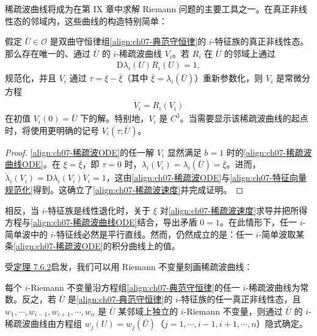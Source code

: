 \documentclass[../../main.tex]{subfiles}
\begin{document}
稀疏波曲线将成为在第 IX 章中求解 Riemann 问题的主要工具之一。在真正非线性态的邻域内，这些曲线的构造特别简单：

\begin{theorem}\label{theorem:ch07-稀疏波曲线存在唯一}
假定 $\bar{U}\in\mathscr{O}$ 是双曲守恒律组\eqref{align:ch07-典范守恒律}的 $i$-特征族的真正非线性态。那么存在唯一的、通过 $\bar{U}$ 的 $i$-稀疏波曲线 $V_i$。若 $R_i$ 在 $\bar{U}$ 的邻域上通过
\begin{align}
\mathrm{D}\lambda_i(U)R_i(U)=1,
\label{align:ch07-特征向量规范化}
\end{align}
规范化，并且 $V_i$ 通过 $\tau=\xi-\bar{\xi}$（其中 $\bar{\xi}=\lambda_i(\bar{U})$）重新参数化，则 $V_i$ 是常微分方程
\begin{align}
\dot{V}_i=R_i(V_i)
\label{align:ch07-稀疏波ODE}
\end{align}
在初值 $V_i(0)=\bar{U}$ 下的解。特别地，$V_i$ 是 $C^3$。当需要显示该稀疏波曲线的起点时，将使用更明确的记号 $V_i(\tau;\bar{U})$。
\end{theorem}

\begin{proof}
\eqref{align:ch07-稀疏波ODE}的任一解 $V_i$ 显然满足 $b=1$ 时的\eqref{align:ch07-稀疏波曲线ODE}。在 $\xi=\bar{\xi}$，即 $\tau=0$ 时，$\lambda_i(V_i)=\lambda_i(\bar{U})=\bar{\xi}$。进而，$\dot{\lambda}_i(V_i)=\mathrm{D}\lambda_i(V_i)\dot{V}_i=1$，这由\eqref{align:ch07-稀疏波ODE}与\eqref{align:ch07-特征向量规范化}得到。这确立了\eqref{align:ch07-稀疏波速度}并完成证明。
\end{proof}

相反，当 $i$-特征族是线性退化时，关于 $\xi$ 对\eqref{align:ch07-稀疏波速度}求导并把所得方程与\eqref{align:ch07-稀疏波曲线ODE}结合，导出矛盾 $0=1$。在此情形下，任一 $i$-简单波中的 $i$-特征线必然是平行直线。然而，仍然成立的是：任一 $i$-简单波取某条\eqref{align:ch07-稀疏波ODE}的积分曲线上的值。

受\hyperref[theorem:ch07-简单波Riemann判据]{定理 7.6.2}启发，我们可以用 Riemann 不变量刻画稀疏波曲线：

\begin{theorem}\label{theorem:ch07-稀疏波曲线Riemann刻画}
每个 $i$-Riemann 不变量沿方程组\eqref{align:ch07-典范守恒律}的任一 $i$-稀疏波曲线为常数。反之，若 $\bar{U}$ 是\eqref{align:ch07-典范守恒律}的 $i$-特征族的任一真正非线性态，且 $w_1,\cdots,w_{i-1},w_{i+1},\cdots,w_n$ 是 $\bar{U}$ 某邻域上独立的 $i$-Riemann 不变量，则通过 $\bar{U}$ 的 $i$-稀疏波曲线由方程组 $w_j(U)=w_j(\bar{U})$（$j=1,\cdots,i-1,i+1,\cdots,n$）隐式确定。
\end{theorem}
\end{document}

